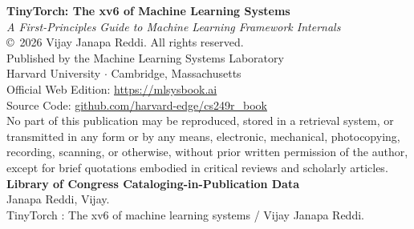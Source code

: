 
\begin{titlepage}

\thispagestyle{empty}
\clearpage

\thispagestyle{empty}
\vspace*{\fill}
\begin{flushleft}
{\fontsize{9}{13}\selectfont\color{bodygray!85}
\textbf{TinyTorch: The xv6 of Machine Learning Systems}\\
\textit{A First-Principles Guide to Machine Learning Framework Internals}\\
\vspace{1.2em}
\copyright\ 2026 Vijay Janapa Reddi. All rights reserved.\\
\vspace{0.6em}
Published by the Machine Learning Systems Laboratory\\
Harvard University $\cdot$ Cambridge, Massachusetts\\
Official Web Edition: \href{https://mlsysbook.ai}{https://mlsysbook.ai}\\
Source Code: \href{https://github.com/harvard-edge/cs249r_book}{github.com/harvard-edge/cs249r\_book}\\
\vspace{1.5em}
No part of this publication may be reproduced, stored in a retrieval system, or transmitted in any form or by any means, electronic, mechanical, photocopying, recording, scanning, or otherwise, without prior written permission of the author, except for brief quotations embodied in critical reviews and scholarly articles.\\
\vspace{1.5em}
\textbf{Library of Congress Cataloging-in-Publication Data}\\
Janapa Reddi, Vijay.\\
TinyTorch : The xv6 of machine learning systems / Vijay Janapa Reddi.\\
}
\end{flushleft}
\end{titlepage}
